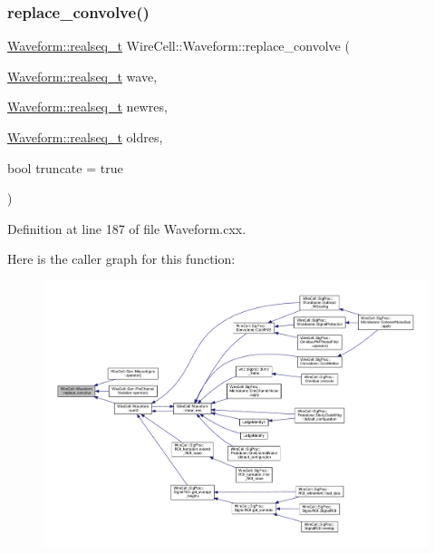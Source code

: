 \subsubsection{\texorpdfstring{replace\+\_\+convolve()}{replace\_convolve()}}
{\footnotesize\ttfamily \hyperlink{namespace_wire_cell_1_1_waveform_a479175e541c8545e87cd8063b74b6956}{Waveform\+::realseq\+\_\+t} Wire\+Cell\+::\+Waveform\+::replace\+\_\+convolve (\begin{DoxyParamCaption}\item[{\hyperlink{namespace_wire_cell_1_1_waveform_a479175e541c8545e87cd8063b74b6956}{Waveform\+::realseq\+\_\+t}}]{wave,  }\item[{\hyperlink{namespace_wire_cell_1_1_waveform_a479175e541c8545e87cd8063b74b6956}{Waveform\+::realseq\+\_\+t}}]{newres,  }\item[{\hyperlink{namespace_wire_cell_1_1_waveform_a479175e541c8545e87cd8063b74b6956}{Waveform\+::realseq\+\_\+t}}]{oldres,  }\item[{bool}]{truncate = {\ttfamily true} }\end{DoxyParamCaption})}



Definition at line 187 of file Waveform.\+cxx.

Here is the caller graph for this function\+:
\nopagebreak
\begin{figure}[H]
\begin{center}
\leavevmode
\includegraphics[width=350pt]{namespace_wire_cell_1_1_waveform_abd675d86a770025f3ace47b277bf0e0e_icgraph}
\end{center}
\end{figure}
\mbox{\label{namespace_wire_cell_1_1_waveform_ad08232b659cba09cf7174b900c557be5}} 
